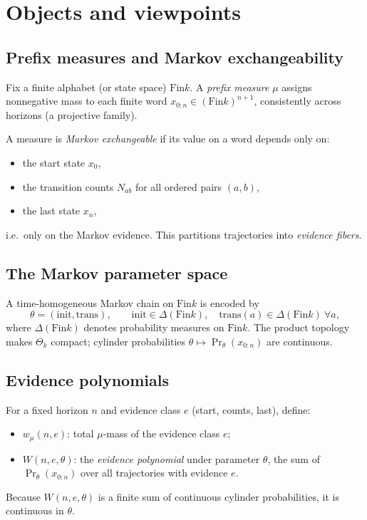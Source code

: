 \documentclass[11pt]{article}
\newcommand{\Fin}{\mathrm{Fin}}
\begin{document}
\section{Objects and viewpoints}

\subsection{Prefix measures and Markov exchangeability}

Fix a finite alphabet (or state space) $\Fin k$.
A \emph{prefix measure} $\mu$ assigns nonnegative mass to each finite word
$x_{0:n} \in (\Fin k)^{n+1}$, consistently across horizons (a projective family).

A measure is \emph{Markov exchangeable} if its value on a word depends only on:
\begin{itemize}
\item the start state $x_0$,
\item the transition counts $N_{ab}$ for all ordered pairs $(a,b)$,
\item the last state $x_n$,
\end{itemize}
i.e.\ only on the Markov evidence. This partitions trajectories into \emph{evidence fibers}.

\subsection{The Markov parameter space}

A time-homogeneous Markov chain on $\Fin k$ is encoded by
\[
\theta = (\mathrm{init}, \mathrm{trans}), \qquad
\mathrm{init}\in \Delta(\Fin k),\quad \mathrm{trans}(a)\in \Delta(\Fin k)\ \forall a,
\]
where $\Delta(\Fin k)$ denotes probability measures on $\Fin k$.
The product topology makes $\Theta_k$ compact; cylinder probabilities
$\theta \mapsto \Pr_\theta(x_{0:n})$ are continuous.

\subsection{Evidence polynomials}

For a fixed horizon $n$ and evidence class $e$ (start, counts, last), define:
\begin{itemize}
\item $w_\mu(n,e)$: total $\mu$-mass of the evidence class $e$;
\item $W(n,e,\theta)$: the \emph{evidence polynomial} under parameter $\theta$,
the sum of $\Pr_\theta(x_{0:n})$ over all trajectories with evidence $e$.
\end{itemize}
Because $W(n,e,\theta)$ is a finite sum of continuous cylinder probabilities, it is continuous in
$\theta$.
\end{document}
